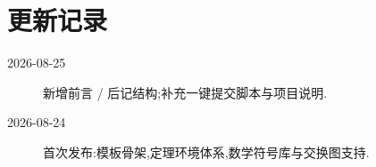 \section*{更新记录}
{}

\begin{description}
    \item[2026-08-25] 新增前言 / 后记结构;补充一键提交脚本与项目说明.
    \item[2026-08-24] 首次发布:模板骨架,定理环境体系,数学符号库与交换图支持.
\end{description}
